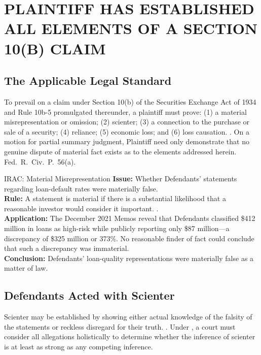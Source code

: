 \section{PLAINTIFF HAS ESTABLISHED ALL ELEMENTS OF A SECTION 10(B) CLAIM}

\subsection{The Applicable Legal Standard}

To prevail on a claim under Section 10(b) of the Securities Exchange Act of 1934 and Rule 10b-5 promulgated thereunder, a plaintiff must prove: (1) a material misrepresentation or omission; (2) scienter; (3) a connection to the purchase or sale of a security; (4) reliance; (5) economic loss; and (6) loss causation. . On a motion for partial summary judgment, Plaintiff need only demonstrate that no genuine dispute of material fact exists as to the elements addressed herein. Fed.\ R.\ Civ.\ P.\ 56(a).

\begin{iracblock}{IRAC: Material Misrepresentation}
\textbf{Issue:} Whether Defendants' statements regarding loan-default rates were materially false.\\[4pt]
\textbf{Rule:} A statement is material if there is a substantial likelihood that a reasonable investor would consider it important. .\\[4pt]
\textbf{Application:} The December 2021 Memos reveal that Defendants classified \$412 million in loans as high-risk while publicly reporting only \$87 million---a discrepancy of \$325 million or 373\%. No reasonable finder of fact could conclude that such a discrepancy was immaterial.\\[4pt]
\textbf{Conclusion:} Defendants' loan-quality representations were materially false as a matter of law.
\end{iracblock}

\subsection{Defendants Acted with Scienter}

Scienter may be established by showing either actual knowledge of the falsity of the statements or reckless disregard for their truth. . Under , a court must consider all allegations holistically to determine whether the inference of scienter is at least as strong as any competing inference.

